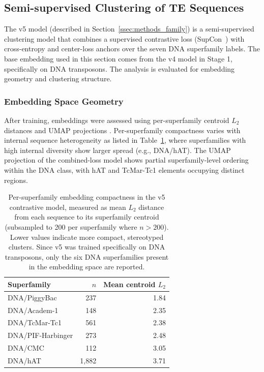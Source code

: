 \documentclass[12pt]{article}
\begin{document}
\clearpage

\subsection{Semi-supervised Clustering of TE Sequences}\label{ssec:clustering}

The v5 model (described in Section~\ref{ssec:methods_family}) is a semi-supervised clustering model that combines a supervised contrastive loss (SupCon~\cite{khosla2020supervised}) with cross-entropy and center-loss anchors over the seven DNA superfamily labels. The base embedding used in this section comes from the v4 model in Stage 1, specifically on DNA transposons. The analysis is evaluated for embedding geometry and clustering structure. 

\subsubsection{Embedding Space Geometry}

After training, embeddings were assessed using per-superfamily centroid $L_2$ distances and UMAP projections \cite{mcginnis2021umap}. Per-superfamily compactness varies with internal sequence heterogeneity as listed in Table~\ref{tab:l2_compactness}, where superfamilies with high internal diversity show larger spread (e.g., DNA/hAT). The UMAP projection of the combined-loss model shows partial superfamily-level ordering within the DNA class, with hAT and TcMar-Tc1 elements occupying distinct regions. 

\begin{table}[h]
\centering
\caption{Per-superfamily embedding compactness in the v5 contrastive model, measured as mean $L_2$ distance from each sequence to its superfamily centroid (subsampled to 200 per superfamily where $n > 200$). Lower values indicate more compact, stereotyped clusters. Since v5 was trained specifically on DNA transposons, only the six DNA superfamilies present in the embedding space are reported.}
\label{tab:l2_compactness}
\begin{tabular}{lrr}
\toprule
Superfamily & $n$ & Mean centroid $L_2$ \\
\midrule
DNA/PiggyBac      & 237  & 1.84 \\
DNA/Academ-1      & 148  & 2.35 \\
DNA/TcMar-Tc1     & 561  & 2.38 \\
DNA/PIF-Harbinger & 273  & 2.48 \\
DNA/CMC           & 112  & 3.05 \\
DNA/hAT           & 1{,}882 & 3.71 \\
\bottomrule
\end{tabular}
\end{table}
\end{document}

